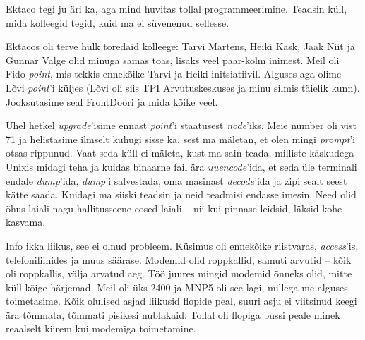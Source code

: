 
Ektaco tegi ju äri ka, aga mind huvitas tollal 
programmeerimine. Teadsin küll, mida kolleegid tegid, kuid ma 
ei süvenenud sellesse.


Ektacos oli terve hulk toredaid kolleege: 
Tarvi Martens, Heiki Kask, Jaak 
Niit ja Gunnar Valge olid 
minuga samas toas, lisaks veel paar-kolm inimest. Meil oli 
Fido \emph{point}, mis tekkis ennekõike Tarvi ja Heiki 
initsiatiivil. Alguses aga olime Lõvi \emph{point}'i küljes 
(Lõvi oli siis TPI 
Arvutuskeskuses ja minu silmis täielik
kunn). Jooksutasime seal FrontDoori ja mida kõike veel. 

Ühel hetkel \emph{upgrade}'isime ennast \emph{point}'i staatusest 
\emph{node}'iks. Meie number oli vist 71 ja helistasime ilmselt
kuhugi sisse ka, sest ma mäletan, et olen mingi \emph{prompt}'i otsas 
rippunud. Vaat seda küll ei mäleta, kust ma sain teada, milliste käskudega 
Unixis midagi teha ja kuidas binaarne fail ära 
\emph{uuencode}'ida, et seda üle terminali endale 
\emph{dump}'ida, \emph{dump}'i salvestada, oma masinast \emph{decode}'ida ja 
zipi sealt seest kätte saada. Kuidagi ma siiski teadsin ja neid teadmisi endasse
imesin. Need olid 
õhus laiali nagu hallitusseene eosed laiali -- nii kui pinnase 
leidsid, läksid kohe kasvama. 


Info ikka liikus, see ei olnud probleem. Küsimus oli 
ennekõike riistvaras, \emph{access}'is, telefoniliinides ja muus säärase. Modemid olid roppkallid, samuti arvutid -- kõik oli roppkallis, 
välja arvatud aeg. Töö juures mingid modemid õnneks olid, mitte küll 
kõige härjemad. Meil oli üks 2400 ja MNP5 oli see lagi, millega me alguses toimetasime. 
Kõik olulised asjad liikusid flopide peal, suuri asju ei viitsinud keegi 
ära tõmmata, tõmmati pisikesi nublakaid. Tollal oli flopiga bussi peale 
minek reaalselt kiirem kui modemiga toimetamine.

